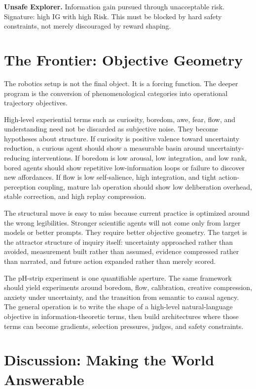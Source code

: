 \documentclass[11pt]{article}
\newcommand{\IG}{\mathrm{IG}}
\newcommand{\Risk}{\mathrm{Risk}}
\begin{document}
\begin{falsifybox}
\textbf{Unsafe Explorer.} Information gain pursued through unacceptable risk. Signature: high $\IG$ with high $\Risk$. This must be blocked by hard safety constraints, not merely discouraged by reward shaping.
\end{falsifybox}

\section{The Frontier: Objective Geometry}

The robotics setup is not the final object. It is a forcing function. The deeper program is the conversion of phenomenological categories into operational trajectory objectives.

High-level experiential terms such as curiosity, boredom, awe, fear, flow, and understanding need not be discarded as subjective noise. They become hypotheses about structure. If curiosity is positive valence toward uncertainty reduction, a curious agent should show a measurable basin around uncertainty-reducing interventions. If boredom is low arousal, low integration, and low rank, bored agents should show repetitive low-information loops or failure to discover new affordances. If flow is low self-salience, high integration, and tight action-perception coupling, mature lab operation should show low deliberation overhead, stable correction, and high replay compression.

The structural move is easy to miss because current practice is optimized around the wrong legibilities. Stronger scientific agents will not come only from larger models or better prompts. They require better objective geometry. The target is the attractor structure of inquiry itself: uncertainty approached rather than avoided, measurement built rather than assumed, evidence compressed rather than narrated, and future action expanded rather than merely scored.

The pH-strip experiment is one quantifiable aperture. The same framework should yield experiments around boredom, flow, calibration, creative compression, anxiety under uncertainty, and the transition from semantic to causal agency. The general operation is to write the shape of a high-level natural-language objective in information-theoretic terms, then build architectures where those terms can become gradients, selection pressures, judges, and safety constraints.

\section{Discussion: Making the World Answerable}
\end{document}
